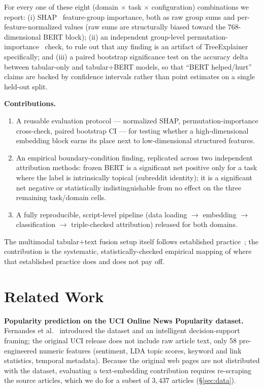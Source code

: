 \documentclass[conference]{IEEEtran}
\begin{document}
For every one of these eight (domain $\times$ task $\times$ configuration) combinations we report: (i) SHAP~\cite{lundberg2017unified} feature-group importance, both as raw group sums and per-feature-normalized values (raw sums are structurally biased toward the 768-dimensional BERT block); (ii) an independent group-level permutation-importance~\cite{breiman2001random,fisher2019models} check, to rule out that any finding is an artifact of TreeExplainer specifically; and (iii) a paired bootstrap significance test on the accuracy delta between tabular-only and tabular+BERT models, so that ``BERT helped/hurt'' claims are backed by confidence intervals rather than point estimates on a single held-out split.

\textbf{Contributions.}
\begin{enumerate}
    \item A reusable evaluation protocol --- normalized SHAP, permutation-importance cross-check, paired bootstrap CI --- for testing whether a high-dimensional embedding block earns its place next to low-dimensional structured features.
    \item An empirical boundary-condition finding, replicated across two independent attribution methods: frozen BERT is a significant net positive only for a task where the label is intrinsically topical (subreddit identity); it is a significant net negative or statistically indistinguishable from no effect on the three remaining task/domain cells.
    \item A fully reproducible, script-level pipeline (data loading $\to$ embedding $\to$ classification $\to$ triple-checked attribution) released for both domains.
\end{enumerate}

The multimodal tabular+text fusion setup itself follows established practice~\cite{shi2021multimodal}; the contribution is the systematic, statistically-checked empirical mapping of where that established practice does and does not pay off.

\section{Related Work}

\textbf{Popularity prediction on the UCI Online News Popularity dataset.} Fernandes et al.~\cite{fernandes2015proactive} introduced the dataset and an intelligent decision-support framing; the original UCI release does not include raw article text, only 58 pre-engineered numeric features (sentiment, LDA topic scores, keyword and link statistics, temporal metadata). Because the original web pages are not distributed with the dataset, evaluating a text-embedding contribution requires re-scraping the source articles, which we do for a subset of $3{,}437$ articles (\S\ref{sec:data}).
\end{document}
